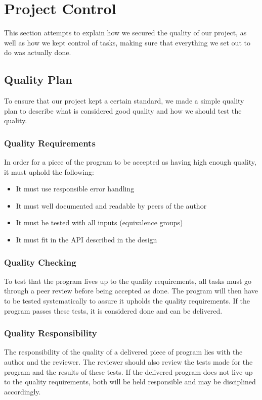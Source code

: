 \section{Project Control}
This section attempts to explain how we secured the quality of our project, as well as how we kept control of tasks, making sure that everything we set out to do was actually done.
\label{sec:EmpiriControl}
\subsection{Quality Plan}
\label{sec:EmpiriQualityControl}
To ensure that our project kept a certain standard, we made a simple quality plan to describe what is considered good quality and how we should test the quality.

\subsubsection{Quality Requirements}
In order for a piece of the program to be accepted as having high enough quality, it must uphold the following:
\begin{itemize}
\item It must use responsible error handling
\item It must well documented and readable by peers of the author
\item It must be tested with all inputs (equivalence groups)
\item It must fit in the API described in the design
\end{itemize}


\subsubsection{Quality Checking}
To test that the program lives up to the quality requirements, all tasks must go through a peer review before being accepted as done. The program will then have to be tested systematically to assure it upholds the quality requirements. If the program passes these tests, it is considered done and can be delivered.

\subsubsection{Quality Responsibility}
The responsibility of the quality of a delivered piece of program lies with the author and the reviewer. The reviewer should also review the tests made for the program and the results of these tests. If the delivered program does not live up to the quality requirements, both will be held responsible and may be disciplined accordingly.

